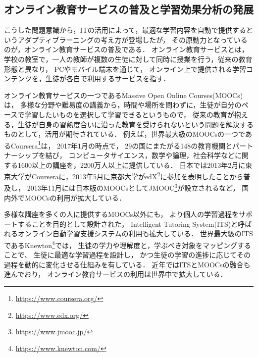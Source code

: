 \subsection{オンライン教育サービスの普及と学習効果分析の発展}
こうした問題意識から，ITの活用によって，最適な学習内容を自動で提供するというアダプティブラーニングの考え方が登場したが，
その原動力となっているのが，オンライン教育サービスの普及である．
オンライン教育サービスとは，
学校の教室で，一人の教師が複数の生徒に対して同時に授業を行う，従来の教育形態と異なり，
PCやモバイル端末を通じて，
オンライン上で提供される学習コンテンツを，生徒が各自で利用するサービスを指す．

オンライン教育サービスの一つであるMassive Open Online Courses(MOOCs)\cite{mcauley2010mooc, pappano2012year,siemens2013massive}は，
多様な分野や難易度の講義から，時間や場所を問わずに，生徒が自分のペースで学習したいものを選択して学習できるというもので，
従来の教育が抱える，生徒が自身の習熟度合いに沿った教育を受けられないという問題を解決するものとして，活用が期待されている．
例えば，世界最大級のMOOCsの一つであるCoursera\footnote{\url{https://www.coursera.org/}}は，
2017年1月の時点で，
29の国にまたがる148の教育機関とパートナーシップを結び，
コンピュータサイエンス，数学や論理，社会科学などに関する1600以上の講座を，2200万人以上に提供している．
日本では2013年2月に東京大学がCourseraに，2013年5月に京都大学がedX\footnote{\url{https://www.edx.org/}}に参加を表明したことから普及し，
2013年11月には日本版のMOOCsとしてJMOOC\footnote{\url{https://www.jmooc.jp/}}が設立されるなど，
国内外でMOOCsの利用が拡大している．

多様な講座を多くの人に提供するMOOCs以外にも，
より個人の学習過程をサポートすることを目的として設計された，
Intelligent Tutoring System(ITS)と呼ばれるオンライン自動学習支援システムの利用も拡大している．
世界最大級のITSであるKnewton\footnote{\url{https://www.knewton.com/}}では，
生徒の学力や理解度と，学ぶべき対象をマッピングすることで、
生徒に最適な学習過程を設計し，
かつ生徒の学習の進捗に応じてその過程を動的に変化させる仕組みを有している\cite{upbin2012knewton}．
近年ではITSとMOOCsの融合も進んでおり\cite{aleven2015beginning}，
オンライン教育サービスの利用は世界中で拡大している．



